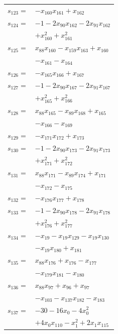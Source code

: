 \begin{longtable}{@{}r@{\;}l@{}}
\(s_{123}=\) & \(\displaystyle -x_{160}x_{161} +x_{162}\) \\[3pt]
\(s_{124}=\) & \(\displaystyle -1 -2x_{90}x_{162} -2x_{91}x_{162}\) \\
 & \(\displaystyle +x_{160}^{2} +x_{161}^{2}\) \\[3pt]
\(s_{125}=\) & \(\displaystyle x_{88}x_{160} -x_{159}x_{163} +x_{160}\) \\
 & \(\displaystyle -x_{161} -x_{164}\) \\[3pt]
\(s_{126}=\) & \(\displaystyle -x_{165}x_{166} +x_{167}\) \\[3pt]
\(s_{127}=\) & \(\displaystyle -1 -2x_{90}x_{167} -2x_{91}x_{167}\) \\
 & \(\displaystyle +x_{165}^{2} +x_{166}^{2}\) \\[3pt]
\(s_{128}=\) & \(\displaystyle x_{88}x_{165} -x_{89}x_{168} +x_{165}\) \\
 & \(\displaystyle -x_{166} -x_{169}\) \\[3pt]
\(s_{129}=\) & \(\displaystyle -x_{171}x_{172} +x_{173}\) \\[3pt]
\(s_{130}=\) & \(\displaystyle -1 -2x_{90}x_{173} -2x_{91}x_{173}\) \\
 & \(\displaystyle +x_{171}^{2} +x_{172}^{2}\) \\[3pt]
\(s_{131}=\) & \(\displaystyle x_{88}x_{171} -x_{89}x_{174} +x_{171}\) \\
 & \(\displaystyle -x_{172} -x_{175}\) \\[3pt]
\(s_{132}=\) & \(\displaystyle -x_{176}x_{177} +x_{178}\) \\[3pt]
\(s_{133}=\) & \(\displaystyle -1 -2x_{90}x_{178} -2x_{91}x_{178}\) \\
 & \(\displaystyle +x_{176}^{2} +x_{177}^{2}\) \\[3pt]
\(s_{134}=\) & \(\displaystyle -x_{19} -x_{19}x_{129} -x_{19}x_{130}\) \\
 & \(\displaystyle -x_{19}x_{180} +x_{181}\) \\[3pt]
\(s_{135}=\) & \(\displaystyle x_{88}x_{176} +x_{176} -x_{177}\) \\
 & \(\displaystyle -x_{179}x_{181} -x_{180}\) \\[3pt]
\(s_{136}=\) & \(\displaystyle x_{88}x_{97} +x_{96} +x_{97}\) \\
 & \(\displaystyle -x_{103} -x_{137}x_{182} -x_{183}\) \\[3pt]
\(s_{137}=\) & \(\displaystyle -30 -16x_{0} -4x_{0}^{2}\) \\
 & \(\displaystyle +4x_{0}x_{110} -x_{1}^{2} +2x_{1}x_{115}\) \\

\end{longtable}
